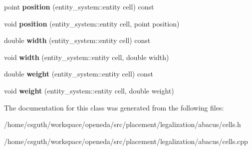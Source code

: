 \begin{DoxyCompactItemize}
\item 
\hypertarget{classophidian_1_1placement_1_1legalization_1_1abacus_1_1cells_a32499b301233cd61254061408752291a}{point {\bfseries position} (entity\-\_\-system\-::entity cell) const }\label{classophidian_1_1placement_1_1legalization_1_1abacus_1_1cells_a32499b301233cd61254061408752291a}

\item 
\hypertarget{classophidian_1_1placement_1_1legalization_1_1abacus_1_1cells_a4a60594ee4ade2092dcf5add09366467}{void {\bfseries position} (entity\-\_\-system\-::entity cell, point position)}\label{classophidian_1_1placement_1_1legalization_1_1abacus_1_1cells_a4a60594ee4ade2092dcf5add09366467}

\item 
\hypertarget{classophidian_1_1placement_1_1legalization_1_1abacus_1_1cells_a0842cc3298df31811b74328de548a036}{double {\bfseries width} (entity\-\_\-system\-::entity cell) const }\label{classophidian_1_1placement_1_1legalization_1_1abacus_1_1cells_a0842cc3298df31811b74328de548a036}

\item 
\hypertarget{classophidian_1_1placement_1_1legalization_1_1abacus_1_1cells_a8f54ed362038584af4cd2855ee0c0a5e}{void {\bfseries width} (entity\-\_\-system\-::entity cell, double width)}\label{classophidian_1_1placement_1_1legalization_1_1abacus_1_1cells_a8f54ed362038584af4cd2855ee0c0a5e}

\item 
\hypertarget{classophidian_1_1placement_1_1legalization_1_1abacus_1_1cells_ae6ead610bc5cdfcb011d6f1d1c0ae2d6}{double {\bfseries weight} (entity\-\_\-system\-::entity cell) const }\label{classophidian_1_1placement_1_1legalization_1_1abacus_1_1cells_ae6ead610bc5cdfcb011d6f1d1c0ae2d6}

\item 
\hypertarget{classophidian_1_1placement_1_1legalization_1_1abacus_1_1cells_a3fe373d3d386b133447e832441875a93}{void {\bfseries weight} (entity\-\_\-system\-::entity cell, double weight)}\label{classophidian_1_1placement_1_1legalization_1_1abacus_1_1cells_a3fe373d3d386b133447e832441875a93}

\end{DoxyCompactItemize}


The documentation for this class was generated from the following files\-:\begin{DoxyCompactItemize}
\item 
/home/csguth/workspace/openeda/src/placement/legalization/abacus/cells.\-h\item 
/home/csguth/workspace/openeda/src/placement/legalization/abacus/cells.\-cpp\end{DoxyCompactItemize}
